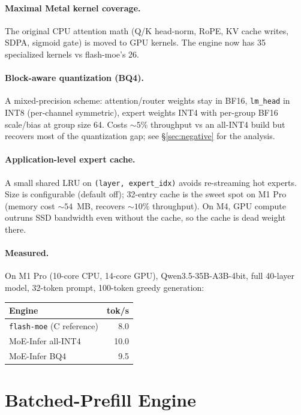 \documentclass[11pt,a4paper]{article}
\begin{document}
\paragraph{Maximal Metal kernel coverage.} The original CPU attention
math (Q/K head-norm, RoPE, KV cache writes, SDPA, sigmoid gate) is
moved to GPU kernels. The engine now has 35 specialized kernels vs
flash-moe's 26.

\paragraph{Block-aware quantization (BQ4).} A mixed-precision scheme:
attention/router weights stay in BF16, \texttt{lm\_head} in INT8
(per-channel symmetric), expert weights INT4 with per-group BF16
scale/bias at group size 64. Costs $\sim 5\%$ throughput vs an
all-INT4 build but recovers most of the quantization gap; see
\S\ref{sec:negative} for the analysis.

\paragraph{Application-level expert cache.} A small shared LRU on
\texttt{(layer, expert\_idx)} avoids re-streaming hot experts. Size is
configurable (default off); 32-entry cache is the sweet spot on M1 Pro
(memory cost $\sim 54$~MB, recovers $\sim 10\%$ throughput). On M4,
GPU compute outruns SSD bandwidth even without the cache, so the cache
is dead weight there.

\paragraph{Measured.} On M1 Pro (10-core CPU, 14-core GPU),
Qwen3.5-35B-A3B-4bit, full 40-layer model, 32-token prompt,
100-token greedy generation:

\begin{center}
\begin{tabular}{lr}
\toprule
Engine & tok/s \\
\midrule
\texttt{flash-moe} (C reference) & 8.0 \\
MoE-Infer all-INT4 & 10.0 \\
MoE-Infer BQ4 & 9.5 \\
\bottomrule
\end{tabular}
\end{center}

\section{Batched-Prefill Engine}\label{sec:batched}
\end{document}
